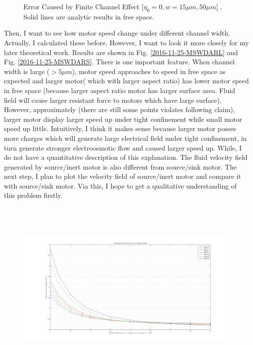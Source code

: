 \documentclass[fontsize=11pt, %
                             paper=a4, %
                             twoside, %
                             captions=tableheading,
                             index=totoc,
                             hyperref]{labbook}
\begin{document}
\begin{addmargin}[4cm]{0cm}
\begin{figure}
\caption{Error Caused by Finite Channel Effect [$\eta_0=0, w=15\mu m, 50\mu m$] . Solid lines are analytic results in free space.}\label{2016-11-25-ECBFCE}
\end{figure}

Then, I want to see how motor speed change under different channel width. Actually, I calculated these before. However, I want to look it more closely for my later theoretical work. Results are shown in Fig. \ref{2016-11-25-MSWDARL} and Fig. \ref{2016-11-25-MSWDARS}. There is one important feature. When channel width is large ($> 5\mu m$), motor speed approaches to speed in free space as expected and larger motor( which with larger aspect ratio) has lower motor speed in free space (because larger aspect ratio motor has larger surface area. Fluid field will cause larger resistant force to motors which have large surface). However, approximately (there are still some points violates following claim), larger motor display larger speed up under tight confinement while small motor speed up little. Intuitively, I think it makes sense because larger motor posses more charges which will generate large electrical field under tight confinement, in turn generate stronger electroosmotic flow and caused larger speed up. While, I do not have a quantitative description of this explanation. The fluid velocity field generated by source/inert motor is also different from source/sink motor. The next step, I plan to plot the velocity field of source/inert motor and compare it with source/sink motor. Via this, I hope to get a qualitative understanding of this problem firstly.
\begin{figure}
\centering
\includegraphics[width=\linewidth, height=3.5in]{2016-11-25-MotorSpeed_DiffCWidth_large.png}

\end{figure}
\end{addmargin}
\end{document}

